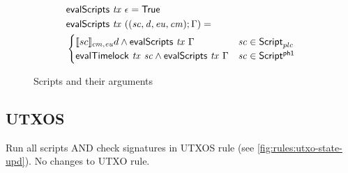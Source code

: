 \begin{figure}[htb]
  \begin{align*}
    & \mathsf{evalScripts}~\mathit{tx}~\epsilon = \mathsf{True} \\
    & \mathsf{evalScripts}~\mathit{tx}~((\mathit{sc}, \mathit{d}, \mathit{eu}, \mathit{cm});\Gamma) = \\
      & \begin{cases}
        \llbracket sc \rrbracket_{cm,\mathit{eu}} d \land \mathsf{evalScripts}~\mathit{tx}~\Gamma & \mathit{sc}\in\mathsf{Script}_{plc} \\
        \mathsf{evalTimelock}~\mathit{tx}~\mathit{sc} \land \mathsf{evalScripts}~\mathit{tx}~\Gamma & \mathit{sc}\in\mathsf{Script^{ph1}}
      \end{cases}
  \end{align*}
  \caption{Scripts and their arguments}
  \label{fig:functions:script2}
\end{figure}

\subsection{UTXOS}


Run all scripts AND check signatures in UTXOS rule
(see \ref{fig:rules:utxo-state-upd}). No changes to UTXO rule.


